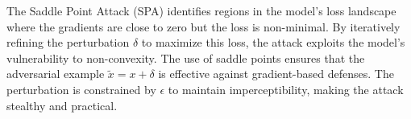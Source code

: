 The Saddle Point Attack (SPA) identifies regions in the model's loss landscape where the gradients are close to zero but the loss is non-minimal. By iteratively refining the perturbation \( \delta \) to maximize this loss, the attack exploits the model's vulnerability to non-convexity. The use of saddle points ensures that the adversarial example \( \tilde{x} = x + \delta \) is effective against gradient-based defenses. The perturbation is constrained by \( \epsilon \) to maintain imperceptibility, making the attack stealthy and practical.
